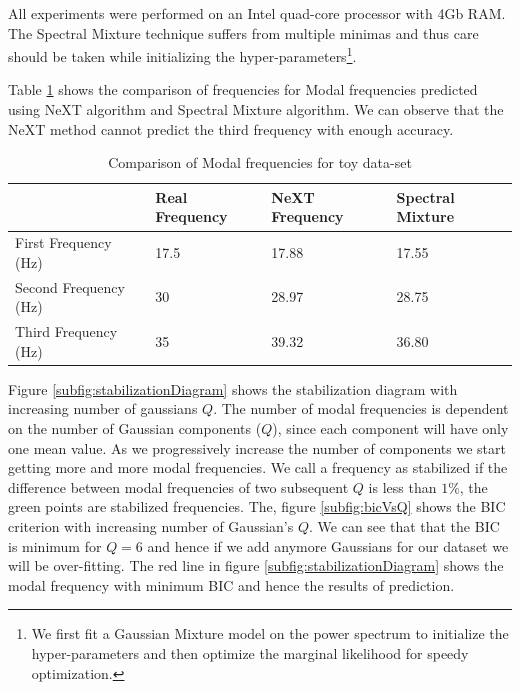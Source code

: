 All experiments were performed on an Intel quad-core processor with 4Gb RAM. The Spectral Mixture technique suffers from multiple minimas and thus care should be taken while initializing the hyper-parameters\footnote{We first fit a Gaussian Mixture model on the power spectrum to initialize the hyper-parameters and then optimize the marginal likelihood for speedy optimization.}.  

Table \ref{tabComparisonOfModalFrequenciesToyData} shows the comparison of frequencies for Modal frequencies predicted using NeXT algorithm and Spectral Mixture algorithm. We can observe that the NeXT method cannot predict the third frequency with enough accuracy. 

\renewcommand{\arraystretch}{1}
\begin{table}[!h]
    \centering
\begin{tabular}{|l|l|l|l|}
  \hline
   & Real Frequency & NeXT Frequency & Spectral Mixture\\
  \hline 
  \hline
First Frequency (Hz) & 17.5 & 17.88 & 17.55\\
Second Frequency (Hz)  & 30 & 28.97 & 28.75\\
Third Frequency (Hz) & 35 & 39.32 & 36.80\\
   \hline
\end{tabular}
\caption{Comparison of Modal frequencies for toy data-set}
  \label{tabComparisonOfModalFrequenciesToyData}
\end{table}

Figure \ref{subfig:stabilizationDiagram} shows the stabilization diagram with increasing number of gaussians $Q$. The number of modal frequencies is dependent on the number of Gaussian components (\(Q\)), since each component will have only one mean value. As we progressively increase the number of components we start getting more and more modal frequencies. We call a frequency as stabilized if the difference between modal frequencies of two subsequent \(Q\) is less than \(1\%\), the green points are stabilized frequencies. The, figure \ref{subfig:bicVsQ} shows the BIC criterion with increasing number of Gaussian's $Q$. We can see that that the BIC is minimum for $Q=6$ and hence if we add anymore Gaussians for our dataset we will be over-fitting. The red line in figure \ref{subfig:stabilizationDiagram} shows the modal frequency with minimum BIC and hence the results of prediction.

